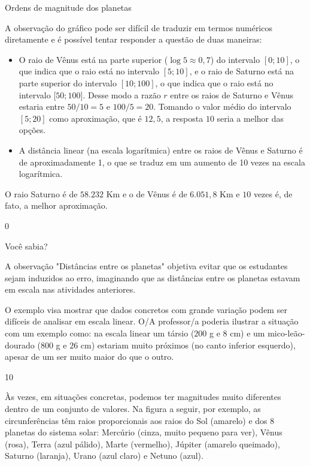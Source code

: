 \begin{answer}{Ordens de magnitude dos planetas}
{
	A observação do gráfico pode ser difícil de traduzir em termos numéricos diretamente e é possível tentar responder a questão de duas maneiras:
	\begin{itemize}
	\item O raio de Vênus está na parte superior ($\log 5 \approx 0{,}7$) do intervalo $[0; 10]$, o que indica que o raio está no intervalo $[5; 10]$, e o raio de Saturno está na parte superior do intervalo $[10; 100]$, o que indica que o raio está no intervalo [$50; 100]$. Desse modo a razão $r$ entre os raios de Saturno e Vênus estaria entre $50/10=5$ e $100/5=20$. Tomando o valor médio do intervalo $[5; 20]$ como aproximação, que é $12{,}5$, a resposta $10$ seria a melhor das opções.
	\item A distância linear (na escala logarítmica) entre os raios de Vênus e Saturno é de aproximadamente 1, o que se traduz em um aumento de 10 vezes na escala logarítmica.
	\end{itemize}
	O raio Saturno é de $58.232$ Km e o de Vênus é de $6.051{,}8$ Km e $10$ vezes é, de fato, a melhor aproximação.
}{0}
\end{answer}

\begin{sugestions}{Você sabia?}
{
	A observação "Distâncias entre os planetas"{} objetiva evitar que os estudantes sejam induzidos ao erro, imaginando que as distâncias entre os planetas estavam em escala nas atividades anteriores.

	O exemplo visa mostrar que dados concretos com grande variação podem ser difíceis de analisar em escala linear. O/A professor/a poderia ilustrar a situação com um exemplo como: na escala linear um társio ($200$ g e $8$ cm) e um mico-leão-dourado ($800$ g e $26$ cm) estariam muito próximos (no canto inferior esquerdo), apesar de um ser muito maior do que o outro.	
}{1}{0}
\end{sugestions}


Às vezes, em situações concretas, podemos ter magnitudes muito diferentes dentro de um conjunto de valores. Na figura a seguir, por exemplo, as circunferências têm raios proporcionais aos raios do Sol (amarelo) e dos 8 planetas do sistema solar: Mercúrio (cinza, muito pequeno para ver), Vênus (rosa), Terra (azul pálido), Marte (vermelho), Júpiter (amarelo queimado), Saturno (laranja), Urano (azul claro) e Netuno (azul).


